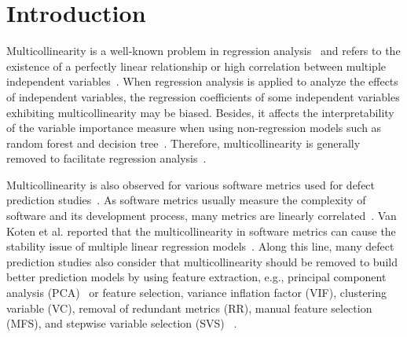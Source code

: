 \chapter{Introduction}
\thispagestyle{fancy}
\bigskip Multicollinearity is a well-known problem in regression analysis~\cite{gujarati2009basic} and refers to the existence of a perfectly linear relationship or high correlation between multiple independent variables~\cite{gujarati2009basic}. When regression analysis is applied to analyze the effects of independent variables, the regression coefficients of some independent variables exhibiting multicollinearity may be biased. 
Besides, it affects the interpretability of the variable importance measure when using non-regression models such as random forest and decision tree~\cite{Laura2011BioinformaticsClassification, Strobl2008BMCConditional}. Therefore, multicollinearity is generally removed to facilitate regression analysis~\cite{gujarati2009basic}.

Multicollinearity is also observed for various software metrics used for defect prediction studies~\cite{Emam2001TSEconfoundingeffect}. As software metrics usually measure the complexity of software and its development process, many metrics are linearly correlated~\cite{Khoshgoftaar1990developmenterrors}.
Van Koten et al. reported that the multicollinearity in software metrics can cause the stability issue of multiple linear regression models~\cite{VanKoten2006ISTmaintainability}.
Along this line, many defect prediction studies also consider that multicollinearity should be removed to build better prediction models by using feature extraction, e.g., principal component analysis (PCA)~\cite{Zhang2017TSEaggregate} or feature selection, variance inflation factor (VIF), clustering variable (VC), removal of redundant metrics (RR), manual feature selection (MFS), and stepwise variable selection (SVS)
~\cite{Kamei2013TSEjit,Taba2013ICSMantipattern,Lee2016TSEMIM,Kamei2016EMSEjit}.


